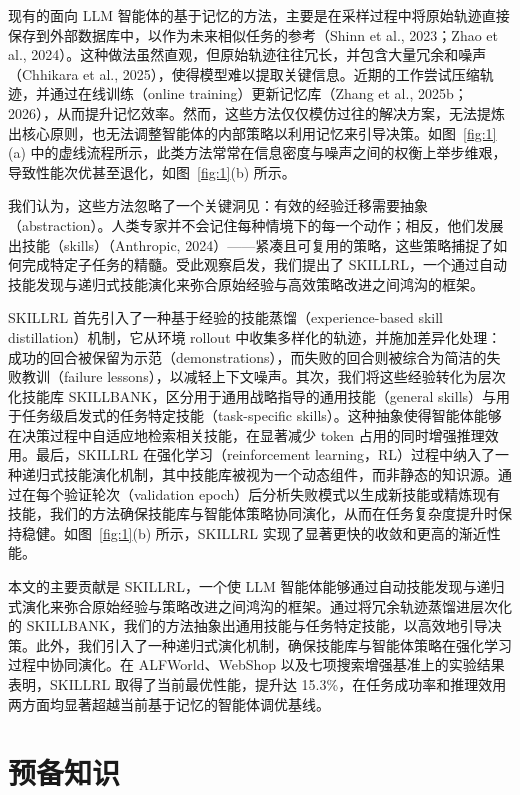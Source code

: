 \documentclass[11pt,UTF8,fontset=fandol]{ctexart}
\begin{document}
现有的面向 LLM 智能体的基于记忆的方法，主要是在采样过程中将原始轨迹直接保存到外部数据库中，以作为未来相似任务的参考（Shinn et al., 2023；Zhao et al., 2024）。这种做法虽然直观，但原始轨迹往往冗长，并包含大量冗余和噪声（Chhikara et al., 2025），使得模型难以提取关键信息。近期的工作尝试压缩轨迹，并通过在线训练（online training）更新记忆库（Zhang et al., 2025b；2026），从而提升记忆效率。然而，这些方法仅仅模仿过往的解决方案，无法提炼出核心原则，也无法调整智能体的内部策略以利用记忆来引导决策。如图~\ref{fig:1}(a) 中的虚线流程所示，此类方法常常在信息密度与噪声之间的权衡上举步维艰，导致性能次优甚至退化，如图~\ref{fig:1}(b) 所示。

我们认为，这些方法忽略了一个关键洞见：有效的经验迁移需要抽象（abstraction）。人类专家并不会记住每种情境下的每一个动作；相反，他们发展出技能（skills）（Anthropic, 2024）——紧凑且可复用的策略，这些策略捕捉了如何完成特定子任务的精髓。受此观察启发，我们提出了 SKILLRL，一个通过自动技能发现与递归式技能演化来弥合原始经验与高效策略改进之间鸿沟的框架。

SKILLRL 首先引入了一种基于经验的技能蒸馏（experience-based skill distillation）机制，它从环境 rollout 中收集多样化的轨迹，并施加差异化处理：成功的回合被保留为示范（demonstrations），而失败的回合则被综合为简洁的失败教训（failure lessons），以减轻上下文噪声。其次，我们将这些经验转化为层次化技能库 SKILLBANK，区分用于通用战略指导的通用技能（general skills）与用于任务级启发式的任务特定技能（task-specific skills）。这种抽象使得智能体能够在决策过程中自适应地检索相关技能，在显著减少 token 占用的同时增强推理效用。最后，SKILLRL 在强化学习（reinforcement learning，RL）过程中纳入了一种递归式技能演化机制，其中技能库被视为一个动态组件，而非静态的知识源。通过在每个验证轮次（validation epoch）后分析失败模式以生成新技能或精炼现有技能，我们的方法确保技能库与智能体策略协同演化，从而在任务复杂度提升时保持稳健。如图~\ref{fig:1}(b) 所示，SKILLRL 实现了显著更快的收敛和更高的渐近性能。

本文的主要贡献是 SKILLRL，一个使 LLM 智能体能够通过自动技能发现与递归式演化来弥合原始经验与策略改进之间鸿沟的框架。通过将冗余轨迹蒸馏进层次化的 SKILLBANK，我们的方法抽象出通用技能与任务特定技能，以高效地引导决策。此外，我们引入了一种递归式演化机制，确保技能库与智能体策略在强化学习过程中协同演化。在 ALFWorld、WebShop 以及七项搜索增强基准上的实验结果表明，SKILLRL 取得了当前最优性能，提升达 15.3\%，在任务成功率和推理效用两方面均显著超越当前基于记忆的智能体调优基线。

\section{预备知识}
\end{document}
